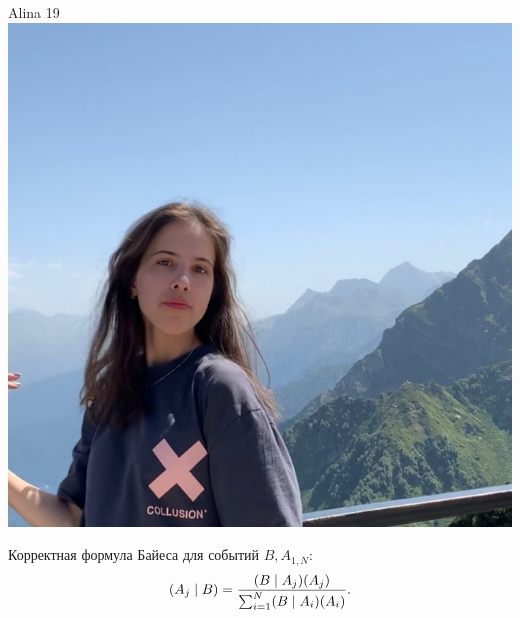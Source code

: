 \documentclass[12pt]{article}
\let\P\relax
\DeclareMathOperator{\P}{\mathbb{P}}
\begin{document}
\begin{minipage}{0.45\textwidth}
\begin{tinderf}{Alina 19}
\includegraphics[width=\textwidth]{tinder-photo/alina.jpg}

  

\begin{mybox}
Корректная формула Байеса для событий $B, A_{1,N}$: 
\[
\P(A_{j}\mid B) = \frac{\P(B \mid A_{j})\P(A_{j})}{\sum_{i=1}^{N} \P(B \mid A_{i})\P(A_{i})}.
\]
\end{mybox}
\end{tinderf}
\end{minipage}
\newpage
%
\end{document}
